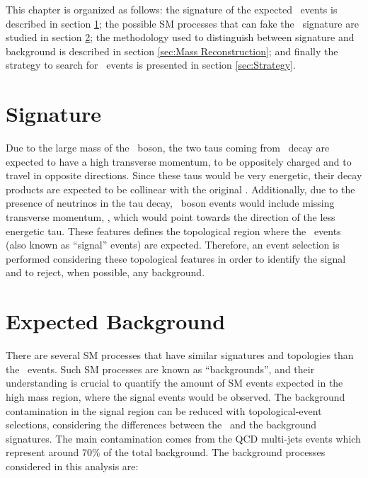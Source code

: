 \noindent This chapter is organized as follows: the signature of the expected \Zprimetotauh~events
is described in section \ref{sec:Signal}; the possible SM processes that can fake the 
\Zprimetotauh~signature are studied in section \ref{sec:Bkg}; the methodology used to distinguish
between signature and background is described in section \ref{sec:Mass Reconstruction}; 
and finally the strategy to search for \Zprimetotauh~events is presented in section \ref{sec:Strategy}.

\section{Signature}
\label{sec:Signal}

Due to the large mass of the \Zprime~boson, the two taus coming from \Zprimetotautau~decay are 
expected to have a high transverse momentum, to be oppositely charged and to travel 
in opposite directions. Since these taus would be very energetic, their decay 
products are expected to be collinear with the original \tauh. Additionally, due 
to the presence of neutrinos in the tau decay, \Zprime~boson events would include 
missing transverse momentum, \METv, which would point towards the direction of the less 
energetic tau. These features defines the topological region where 
the \Zprimetotauh~events (also known as ``signal'' events) are expected. Therefore, 
 an event selection is performed considering these topological features
in order to identify the signal and to reject, when possible, any background.


\section{Expected Background}
\label{sec:Bkg}

There are several SM processes that have similar signatures
and topologies than the \Zprimetotauh~events. Such SM processes
are known as ``backgrounds'', and their understanding is crucial to  quantify 
the amount of SM events expected in the high mass 
region, where the signal events would be observed. The background
contamination in the signal region can be reduced with
topological-event selections, considering the differences between the 
\Zprimetotauh~and the background signatures. The main 
contamination comes from the QCD multi-jets events
which represent around 70$\%$ of the total background. The background
processes considered in this analysis are:

